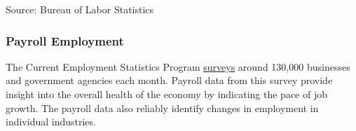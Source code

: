 \documentclass{report}
\begin{document}
{\begin{minipage}{0.76\textwidth}
\vspace{-1mm}	
\footnotesize{Source: Bureau of Labor Statistics}
\end{minipage}
\newpage
\begin{minipage}{0.76\textwidth}  
\subsubsection*{Payroll Employment}
\small The Current Employment Statistics Program \href{https://www.bls.gov/ces/}{surveys} around 130,000 businesses and government agencies each month. Payroll data from this survey provide insight into the overall health of the economy by indicating the pace of job growth. The payroll data also reliably identify changes in employment in individual industries. 
\vspace{1mm}


\end{minipage}}
\end{document}
